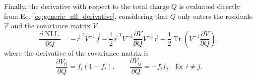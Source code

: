 Finally, the derivative with respect to the total charge $Q$ is evaluated directly from Eq. \ref{eq:generic_nll_derivative}, considering that $Q$ only enters the residuals $\vec{r}$ and the covariance matrix $V$
\begin{equation}
\frac{\partial \operatorname{NLL}}{\partial Q} = - \vec{r}^{\,T} V^{-1} \vec{f} - \frac{1}{2} \vec{r}^{\,T} V^{-1} \frac{\partial V}{\partial Q} V^{-1} \vec{r} + \frac{1}{2} \operatorname{Tr} \left( V^{-1} \frac{\partial V}{\partial Q} \right),
\end{equation}
where the derivative of the covariance matrix is
\begin{equation}
\frac{\partial V_{ii}}{\partial Q} = f_i (1-f_i), \quad \quad \frac{\partial V_{ij}}{\partial Q} = - f_i f_j \quad \textrm{for } i \neq j.
\end{equation}

